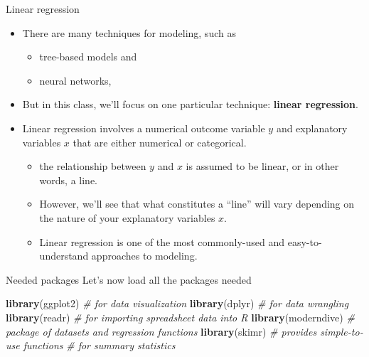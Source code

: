 \documentclass[
  ignorenonframetext,
]{beamer}
\newenvironment{Shaded}{\begin{snugshade}}{\end{snugshade}}
\newcommand{\CommentTok}[1]{\textcolor[rgb]{0.56,0.35,0.01}{\textit{#1}}}
\newcommand{\FunctionTok}[1]{\textcolor[rgb]{0.13,0.29,0.53}{\textbf{#1}}}
\newcommand{\NormalTok}[1]{#1}
\providecommand{\tightlist}{%
  \setlength{\itemsep}{0pt}\setlength{\parskip}{0pt}}
\begin{document}
\begin{frame}{Linear regression}
\protect\hypertarget{linear-regression}{}
\begin{itemize}
\item
  There are many techniques for modeling, such as

  \begin{itemize}
  \tightlist
  \item
    tree-based models and
  \item
    neural networks,
  \end{itemize}
\item
  But in this class, we'll focus on one particular technique:
  \textbf{linear regression}.
\item
  Linear regression involves a numerical outcome variable \(y\) and
  explanatory variables \(x\) that are either numerical or categorical.

  \begin{itemize}
  \tightlist
  \item
    the relationship between \(y\) and \(x\) is assumed to be linear, or
    in other words, a line.
  \item
    However, we'll see that what constitutes a ``line'' will vary
    depending on the nature of your explanatory variables \(x\).
  \item
    Linear regression is one of the most commonly-used and
    easy-to-understand approaches to modeling.
  \end{itemize}
\end{itemize}
\end{frame}

\begin{frame}[fragile]{Needed packages}
\protect\hypertarget{needed-packages}{}
Let's now load all the packages needed

\normalsize

\begin{Shaded}
\begin{Highlighting}[]
\FunctionTok{library}\NormalTok{(ggplot2)    }\CommentTok{\#  for data visualization}
\FunctionTok{library}\NormalTok{(dplyr)      }\CommentTok{\#  for data wrangling}
\FunctionTok{library}\NormalTok{(readr)      }\CommentTok{\# for importing spreadsheet data into R}
\FunctionTok{library}\NormalTok{(moderndive) }\CommentTok{\# package of datasets and regression functions}
\FunctionTok{library}\NormalTok{(skimr)      }\CommentTok{\# provides simple{-}to{-}use functions }
                    \CommentTok{\# for summary statistics}
\end{Highlighting}
\end{Shaded}

\normalsize
\end{frame}
\end{document}
